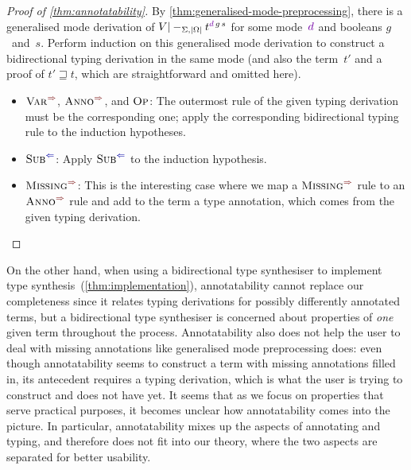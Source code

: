 \begin{proof}[Proof of \cref{thm:annotatability}]
By \cref{thm:generalised-mode-preprocessing}, there is a generalised mode derivation of $V |-_{\Sigma,\erase\Omega} t^{\dir{d}\,g\,s}$ for some mode~$\dir{d}$ and booleans $g$~and~$s$.
Perform induction on this generalised mode derivation to construct a bidirectional typing derivation in the same mode (and also the term~$t'$ and a proof of $t' \sqsupseteq t$, which are straightforward and omitted here).
\begin{itemize}
\item $\SynRule{Var}$, $\SynRule{Anno}$, and $\textnormal{\textsc{Op}}$:
The outermost rule of the given typing derivation must be the corresponding one; apply the corresponding bidirectional typing rule to the induction hypotheses.
\item $\ChkRule{Sub}$:
Apply $\ChkRule{Sub}$ to the induction hypothesis.
\item $\SynRule{Missing}$:
This is the interesting case where we map a $\SynRule{Missing}$ rule to an $\SynRule{Anno}$ rule and add to the term a type annotation, which comes from the given typing derivation.
\vspace{-\topsep-\baselineskip}
\end{itemize}
\end{proof}

On the other hand, when using a bidirectional type synthesiser to implement type synthesis~(\cref{thm:implementation}), annotatability cannot replace our completeness since it relates typing derivations for possibly differently annotated terms, but a bidirectional type synthesiser is concerned about properties of \emph{one} given term throughout the process.
Annotatability also does not help the user to deal with missing annotations like generalised mode preprocessing does: even though annotatability seems to construct a term with missing annotations filled in, its antecedent requires a typing derivation, which is what the user is trying to construct and does not have yet.
It seems that as we focus on properties that serve practical purposes, it becomes unclear how annotatability comes into the picture.
In particular, annotatability mixes up the aspects of annotating and typing, and therefore does not fit into our theory, where the two aspects are separated for better usability.
